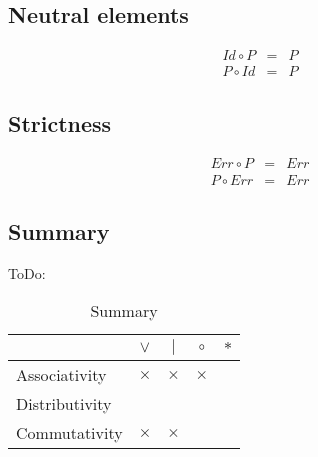 \subsection{Neutral elements}
\begin{eqnarray*}
  Id \circ P & = & P \\
  P \circ Id & = & P
\end{eqnarray*}

\subsection{Strictness}
\begin{eqnarray*}
  Err \circ P & = & Err \\
  P \circ Err & = & Err
\end{eqnarray*}

\subsection{Summary}
ToDo:
\begin{table}[h]
  \centering
  \begin{tabular}{|l|c|c|c|c|}
    \hline
    & $\vee$ & $|$ & $\circ$ & $*$ \\
    \hline
    \hline
    Associativity & $\times$ & $\times$ & $\times$ & \\
    \hline
    Distributivity & & & & \\
    \hline
    Commutativity & $\times$ & $\times$ & & \\
    \hline
  \end{tabular}
  \caption{Summary}
\end{table}

\lipsum[7]